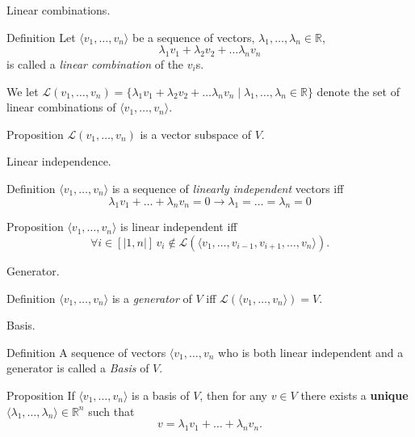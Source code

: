 \documentclass{beamer}
\begin{document}
\begin{frame}{Linear combinations.}
  \begin{block}{Definition}
    Let $\langle v_1, \dots, v_n \rangle$ be a sequence of vectors, $\lambda_1, \dots, \lambda_n \in \mathbb{R}$,
    \[\lambda_1 v_1 + \lambda_2 v_2 + \dots \lambda_n v_n\] is called a \emph{linear combination} of the $v_i$s.

   We let $\mathcal{L}(v_1, \dots, v_n) = \{ \lambda_1 v_1 + \lambda_2 v_2 + \dots \lambda_n v_n \mid \lambda_1, \dots, \lambda_n \in \mathbb{R}\}$ denote the set of linear combinations of $\langle v_1, \dots, v_n \rangle$.
  \end{block}

  \begin{block}{Proposition}
     $\mathcal{L}(v_1, \dots, v_n)$ is a vector subspace of $V$.
  \end{block}
    
\end{frame}

\begin{frame}{Linear independence.}
  \begin{block}{Definition}
    $\langle v_1, \dots, v_n \rangle$ is a sequence of \emph{linearly independent} vectors iff
    \[\lambda_1 v_1 + \dots + \lambda_n v_n = 0 \rightarrow \lambda_1 = \dots = \lambda_n = 0  \]
  \end{block}

  \begin{block}{Proposition}
    $\langle v_1, \dots, v_n \rangle$ is linear independent iff \[\forall i \in [|1, n|]\, v_i \notin \mathcal{L}(\langle v_1, \dots, v_{i-1}, v_{i+1}, \dots, v_n \rangle).\]
  \end{block}
\end{frame}

\begin{frame}{Generator.}
  \begin{block}{Definition}
    $\langle v_1, \dots, v_n \rangle$ is a \emph{generator} of $V$ iff $\mathcal{L}(\langle v_1, \dots, v_n \rangle) = V$.
  \end{block}
\end{frame}

\begin{frame}{Basis.}
  \begin{block}{Definition}
    A sequence of vectors $\langle v_1, \dots, v_n$ who is both linear independent and a generator is called a \emph{Basis} of $V$.
  \end{block}

  \begin{block}{Proposition}
    If $\langle v_1, \dots, v_n \rangle$ is a basis of $V$, then for any $v \in V$ there exists a {\bf unique} $\langle \lambda_1, \dots, \lambda_n \rangle \in \mathbb{R}^n$ such that
    \[ v = \lambda_1v_1 + \dots + \lambda_n v_n. \]
  \end{block}

\end{frame}
\end{document}
